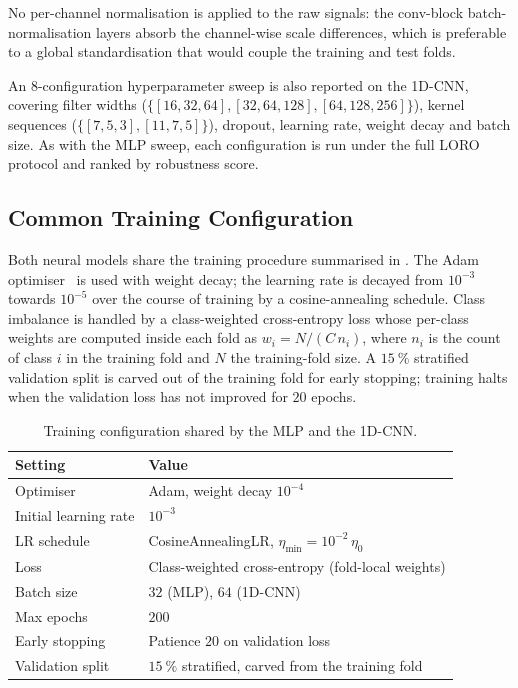 No per-channel normalisation is applied to the raw signals: the conv-block batch-normalisation layers absorb the channel-wise scale differences, which is preferable to a global standardisation that would couple the training and test folds.

An $8$-configuration hyperparameter sweep is also reported on the 1D-CNN, covering filter widths ($\{[16,32,64],[32,64,128],[64,128,256]\}$), kernel sequences ($\{[7,5,3],[11,7,5]\}$), dropout, learning rate, weight decay and batch size. As with the MLP sweep, each configuration is run under the full LORO protocol and ranked by robustness score.

\subsection{Common Training Configuration}

Both neural models share the training procedure summarised in . The Adam optimiser~\cite{Kingma2014} is used with weight decay; the learning rate is decayed from $10^{-3}$ towards $10^{-5}$ over the course of training by a cosine-annealing schedule. Class imbalance is handled by a class-weighted cross-entropy loss whose per-class weights are computed inside each fold as $w_i = N / (C\,n_i)$, where $n_i$ is the count of class $i$ in the training fold and $N$ the training-fold size. A $\SI{15}{\percent}$ stratified validation split is carved out of the training fold for early stopping; training halts when the validation loss has not improved for $20$ epochs.

\begin{table}[H]
\centering
\label{tab:nn_training}
\caption{Training configuration shared by the MLP and the 1D-CNN.}
\begin{tabular}{ll}
\toprule
\textbf{Setting} & \textbf{Value} \\
\midrule
Optimiser            & Adam, weight decay $10^{-4}$~\cite{Kingma2014} \\
Initial learning rate & $10^{-3}$ \\
LR schedule          & CosineAnnealingLR, $\eta_{\min} = 10^{-2}\,\eta_0$ \\
Loss                 & Class-weighted cross-entropy (fold-local weights) \\
Batch size           & $32$ (MLP), $64$ (1D-CNN) \\
Max epochs           & $200$ \\
Early stopping       & Patience $20$ on validation loss \\
Validation split     & $\SI{15}{\percent}$ stratified, carved from the training fold \\
\bottomrule
\end{tabular}
\end{table}

